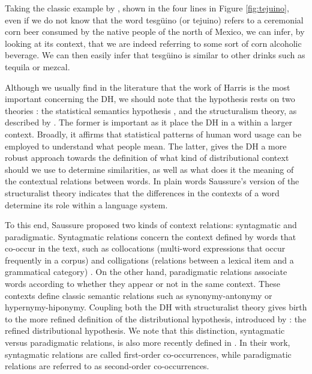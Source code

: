 Taking the classic example by \cite{nida1979componential}, shown in the four lines  in Figure \ref{fig:tejuino}, even if we do not know that the word tesg\"{u}ino (or tejuino) refers to a ceremonial corn beer consumed by the native people of the north of Mexico, we can infer, by looking at its context, that we are indeed referring to some sort of corn alcoholic beverage. We can then easily infer that tesg\"{u}ino is similar to other drinks such as tequila or mezcal.



Although we usually find in the literature that the work of Harris is the most important concerning the DH, we should note that the hypothesis rests on two theories  \cite{sahlgren2008distributional,turney2010}: the statistical semantics hypothesis \cite{booth1955machine}, and the  structuralism theory, as described by \cite{de1916course}. The former is important as it place the DH in a within a larger context. Broadly, it affirms that statistical patterns of human word usage can be employed to understand what people mean. The latter,  gives the DH a more robust approach towards the definition of what kind of distributional context should we use to determine similarities, as well as what does it the meaning of the contextual relations between words. In plain words Saussure's version of the structuralist theory indicates that the differences in the contexts of a word determine its role within a language system. 

To this end, Saussure proposed two kinds of context relations: syntagmatic and paradigmatic. Syntagmatic relations concern the context defined by words that co-occur in the text, such as collocations (multi-word expressions that occur frequently in a corpus) and colligations (relations between a lexical item and a grammatical category) \cite{verschueren2015handbook}. On the other hand, paradigmatic relations associate words according to whether they appear or not in the same context. These contexts define classic semantic relations such as synonymy-antonymy or hypernymy-hiponymy. Coupling both the DH with structuralist theory gives birth to the more refined definition of the distributional hypothesis, introduced by \cite{sahlgren2008distributional}: the refined distributional hypothesis. We note that this distinction, syntagmatic versus paradigmatic relations, is also more recently defined in \cite{schutze1993vector}. In their work, syntagmatic relations are called first-order co-occurrences, while paradigmatic relations  are referred to as second-order co-occurrences.

